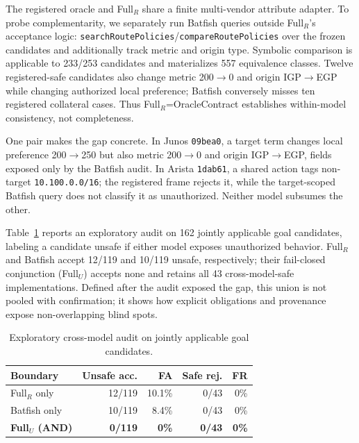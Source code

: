 The registered oracle and Full$_R$ share a finite multi-vendor attribute
adapter.  To probe complementarity, we separately run Batfish queries outside
Full$_R$'s acceptance logic:
\texttt{searchRoutePolicies}/\texttt{compareRoutePolicies} over the frozen
candidates and additionally track metric and origin type.  Symbolic comparison
is applicable to 233/253 candidates and materializes 557 equivalence classes.
Twelve registered-safe candidates also change metric 200$\rightarrow$0 and
origin IGP$\rightarrow$EGP while changing authorized local preference;
Batfish conversely misses ten registered collateral cases.  Thus
Full$_R$=OracleContract establishes within-model consistency, not completeness.

One pair makes the gap concrete.  In Junos \texttt{09bea0}, a target term
changes local preference 200$\rightarrow$250 but also metric
200$\rightarrow$0 and origin IGP$\rightarrow$EGP, fields exposed only by the
Batfish audit.  In Arista \texttt{1dab61}, a shared action tags non-target
\texttt{10.100.0.0/16}; the registered frame rejects it, while the
target-scoped Batfish query does not classify it as unauthorized.  Neither
model subsumes the other.

Table~\ref{tab:cross-model} reports an exploratory audit on 162 jointly
applicable goal candidates, labeling a candidate unsafe if either model exposes
unauthorized behavior.  Full$_R$ and Batfish accept 12/119 and 10/119 unsafe,
respectively; their fail-closed conjunction (Full$_U$) accepts none and retains
all 43 cross-model-safe implementations.  Defined after the audit exposed the
gap, this union is not pooled with confirmation; it shows how explicit
obligations and provenance expose non-overlapping blind spots.

\begin{table}[t]
\caption{Exploratory cross-model audit on jointly applicable goal candidates.}
\label{tab:cross-model}
\centering
\footnotesize
\setlength{\tabcolsep}{3.6pt}
\begin{tabular}{lrrrr}
\toprule
Boundary & Unsafe acc. & FA & Safe rej. & FR \\
\midrule
Full$_R$ only & 12/119 & 10.1\% & 0/43 & 0\% \\
Batfish only & 10/119 & 8.4\% & 0/43 & 0\% \\
\textbf{Full$_U$ (AND)} & \textbf{0/119} & \textbf{0\%} & \textbf{0/43} & \textbf{0\%} \\
\bottomrule
\end{tabular}
\end{table}

